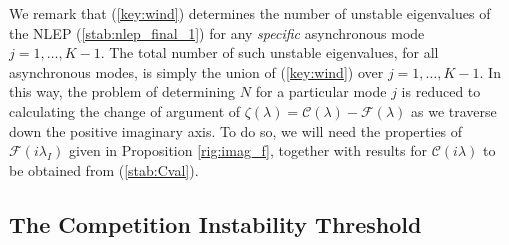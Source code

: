 \documentclass{article}%
\begin{document}
We remark that (\ref{key:wind}) determines the number of unstable
eigenvalues of the NLEP (\ref{stab:nlep_final_1}) for any {\em
  specific} asynchronous mode $j=1,\ldots,K-1$. The total number of
such unstable eigenvalues, for all asynchronous modes, is simply the
union of (\ref{key:wind}) over $j=1,\ldots,K-1$. In this way, the
problem of determining $N$ for a particular mode $j$ is reduced to
calculating the change of argument of $\zeta(\lambda)= {\mathcal
  C}(\lambda)-{\mathcal F}(\lambda)$ as we traverse down the positive
imaginary axis. To do so, we will need the properties of ${\mathcal
  F}(i\lambda_I)$ given in Proposition \ref{rig:imag_f}, together with
results for ${\mathcal C}(i\lambda)$ to be obtained from
(\ref{stab:Cval}).

\subsection{The Competition Instability Threshold}\label{sec:stab_compt}
\end{document}
